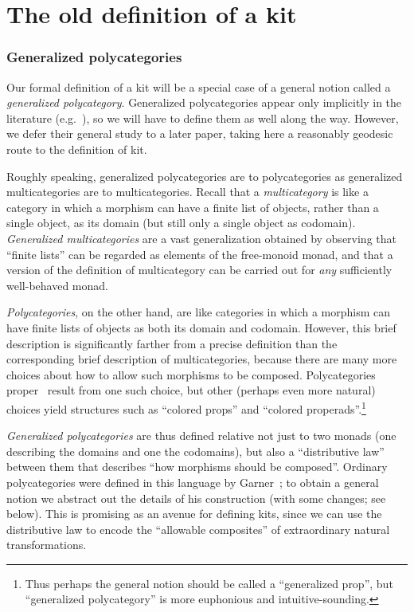\documentclass{amsart}
\begin{document}
\newpage
\part{The old definition of a kit}
\label{part:def}

\section{Generalized polycategories}
\label{sec:genpoly}

Our formal definition of a kit will be a special case of a general notion called a \emph{generalized polycategory}.
Generalized polycategories appear only implicitly in the literature (e.g.~\cite{garner:polycats}), so we will have to define them as well along the way.
However, we defer their general study to a later paper, taking here a reasonably geodesic route to the definition of kit.

Roughly speaking, generalized polycategories are to polycategories as generalized multicategories are to multicategories.
Recall that a \emph{multicategory} is like a category in which a morphism can have a finite list of objects, rather than a single object, as its domain (but still only a single object as codomain).
\emph{Generalized multicategories} are a vast generalization obtained by observing that ``finite lists'' can be regarded as elements of the free-monoid monad, and that a version of the definition of multicategory can be carried out for \emph{any} sufficiently well-behaved monad.

\emph{Polycategories}, on the other hand, are like categories in which a morphism can have finite lists of objects as both its domain and codomain.
However, this brief description is significantly farther from a precise definition than the corresponding brief description of multicategories, because there are many more choices about how to allow such morphisms to be composed.
Polycategories proper~\cite{szabo:polycats,cs:wk-distrib} result from one such choice, but other (perhaps even more natural) choices yield structures such as ``colored props'' and ``colored properads''.\footnote{Thus perhaps the general notion should be called a ``generalized prop'', but ``generalized polycategory'' is more euphonious and intuitive-sounding.}

\emph{Generalized polycategories} are thus defined relative not just to two monads (one describing the domains and one the codomains), but also a ``distributive law'' between them that describes ``how morphisms should be composed''.
Ordinary polycategories were defined in this language by Garner~\cite{garner:polycats}; to obtain a general notion we abstract out the details of his construction (with some changes; see below).
This is promising as an avenue for defining kits, since we can use the distributive law to encode the ``allowable composites'' of extraordinary natural transformations.
\end{document}
